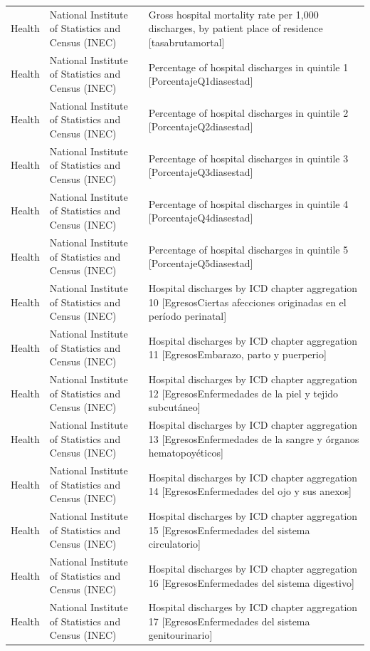 \documentclass[10pt,a4paper]{article}
\begin{document}
\begin{longtable}{@{}>{\raggedright\arraybackslash}p{3.5cm}>{\raggedright\arraybackslash}p{5.6cm}>{\raggedright\arraybackslash}p{\dimexpr\textwidth-9.1cm-4\tabcolsep\relax}@{}}
Health & National Institute of Statistics and Census (INEC) & Gross hospital mortality rate per 1,000 discharges, by patient place of residence [tasabrutamortal]\\
Health & National Institute of Statistics and Census (INEC) & Percentage of hospital discharges in quintile 1 [PorcentajeQ1diasestad]\\
Health & National Institute of Statistics and Census (INEC) & Percentage of hospital discharges in quintile 2 [PorcentajeQ2diasestad]\\
Health & National Institute of Statistics and Census (INEC) & Percentage of hospital discharges in quintile 3 [PorcentajeQ3diasestad]\\
Health & National Institute of Statistics and Census (INEC) & Percentage of hospital discharges in quintile 4 [PorcentajeQ4diasestad]\\
Health & National Institute of Statistics and Census (INEC) & Percentage of hospital discharges in quintile 5 [PorcentajeQ5diasestad]\\
Health & National Institute of Statistics and Census (INEC) & Hospital discharges by ICD chapter aggregation 10 [EgresosCiertas afecciones originadas en el per\'{i}odo perinatal]\\
Health & National Institute of Statistics and Census (INEC) & Hospital discharges by ICD chapter aggregation 11 [EgresosEmbarazo, parto y puerperio]\\
Health & National Institute of Statistics and Census (INEC) & Hospital discharges by ICD chapter aggregation 12 [EgresosEnfermedades de la piel y tejido subcut\'{a}neo]\\
Health & National Institute of Statistics and Census (INEC) & Hospital discharges by ICD chapter aggregation 13 [EgresosEnfermedades de la sangre y \'{o}rganos hematopoy\'{e}ticos]\\
Health & National Institute of Statistics and Census (INEC) & Hospital discharges by ICD chapter aggregation 14 [EgresosEnfermedades del ojo y sus anexos]\\
Health & National Institute of Statistics and Census (INEC) & Hospital discharges by ICD chapter aggregation 15 [EgresosEnfermedades del sistema circulatorio]\\
Health & National Institute of Statistics and Census (INEC) & Hospital discharges by ICD chapter aggregation 16 [EgresosEnfermedades del sistema digestivo]\\
Health & National Institute of Statistics and Census (INEC) & Hospital discharges by ICD chapter aggregation 17 [EgresosEnfermedades del sistema genitourinario]\\

\end{longtable}
\end{document}
